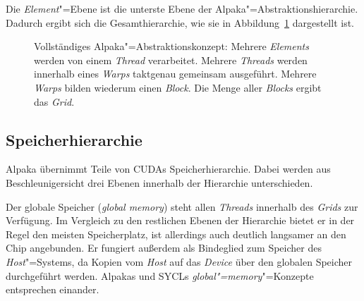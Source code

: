 Die \textit{Element}"=Ebene ist die unterste Ebene der
Alpaka"=Abstraktionshierarchie. Dadurch ergibt sich die Gesamthierarchie, wie
sie in Abbildung~\ref{alpaka:konzepte:abstraktion:elements:vollstaendig}
dargestellt ist.

\begin{figure}
    \centering
    \caption{Vollständiges Alpaka"=Abstraktionskonzept: Mehrere
             \textit{Elements} werden von einem \textit{Thread} verarbeitet.
             Mehrere \textit{Threads} werden innerhalb eines \textit{Warps}
             taktgenau gemeinsam ausgeführt. Mehrere \textit{Warps} bilden
             wiederum einen \textit{Block}. Die Menge aller \textit{Blocks}
             ergibt das \textit{Grid}. \cite[nach][22]{worpitz2015}}
    \label{alpaka:konzepte:abstraktion:elements:vollstaendig}
\end{figure}

\subsection{Speicherhierarchie}
\label{alpaka:konzepte:speicher}

Alpaka übernimmt Teile von CUDAs Speicherhierarchie. Dabei werden aus
Beschleunigersicht drei Ebenen innerhalb der Hierarchie unterschieden.

Der globale Speicher (\textit{global memory}) steht allen \textit{Threads}
innerhalb des \textit{Grids} zur Verfügung. Im Vergleich zu den restlichen
Ebenen der Hierarchie bietet er in der Regel den meisten Speicherplatz, ist
allerdings auch deutlich langsamer an den Chip angebunden. Er fungiert außerdem
als Bindeglied zum Speicher des \textit{Host}"=Systems, da Kopien vom
\textit{Host} auf das \textit{Device} über den globalen Speicher durchgeführt
werden. Alpakas und SYCLs \textit{global"=memory}"=Konzepte entsprechen einander.

